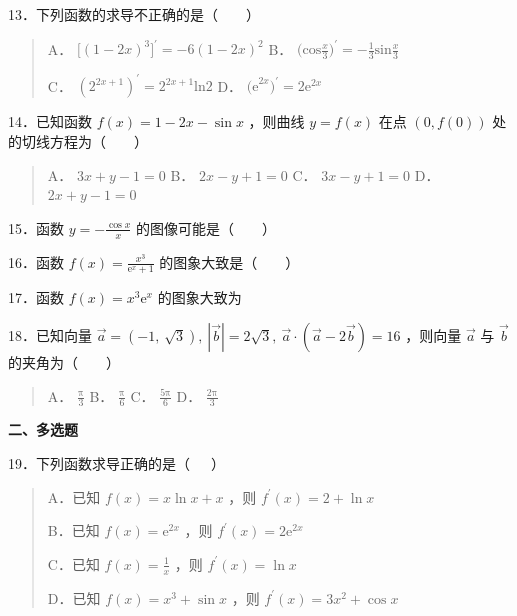 13．下列函数的求导不正确的是（~~~~）

\begin{quote}
    A． $\lbrack{(1 - 2x)}^{3}\rbrack^{\prime} = - 6{(1 - 2x)}^{2}$
    B． $\text{(cos}\frac{x}{3})^{\prime} = - \frac{1}{3}\text{sin}\frac{x}{3}$

    C． $(2^{2x + 1})^{\prime} = 2^{2x + 1}\text{ln}2$
    D． $\text{(e}^{2x})^{\prime} = 2\text{e}^{2x}$
\end{quote}

14．已知函数 $f(x) = 1 - 2x - \sin x$ ，则曲线 $y = f(x)$ 在点 $\left( 0,f(0) \right)$ 处的切线方程为（~~~~）

\begin{quote}
    A． $3x + y - 1 = 0$  B． $2x - y + 1 = 0$  C． $3x - y + 1 = 0$
    D． $2x + y - 1 = 0$
\end{quote}

15．函数 $y = - \frac{\cos x}{x}$ 的图像可能是（~~~~）

\begin{quote}
\end{quote}

16．函数 $f(x) = \frac{x^{3}}{\text{e}^{x} + 1}$ 的图象大致是（~~~~）

\begin{quote}
\end{quote}

17．函数 $f(x) = x^{3}\text{e}^{x}$ 的图象大致为

\begin{quote}
\end{quote}

18．已知向量 $\overrightarrow{a} = \left( - 1,\text{ }\sqrt{3} \right),\text{ }\left| \overrightarrow{b} \right| = 2\sqrt{3},\text{ }\overrightarrow{a} \cdot \left( \overrightarrow{a} - 2\overrightarrow{b} \right) = 16$ ，则向量 $\overrightarrow{a}$ 与 $\overrightarrow{b}$ 的夹角为（~~~~）

\begin{quote}
    A． $\frac{\text{π}}{3}$  B． $\frac{\text{π}}{6}$
    C． $\frac{5\text{π}}{6}$  D． $\frac{2\text{π}}{3}$
\end{quote}

\textbf{二、多选题}

19．下列函数求导正确的是（~~~）

\begin{quote}
    A．已知 $f(x) = x\ln x + x$ ，则 $f^{\prime}(x) = 2 + \ln x$

    B．已知 $f(x) = \text{e}^{2x}$ ，则 $f^{\prime}(x) = 2\text{e}^{2x}$

    C．已知 $f(x) = \frac{1}{x}$ ，则 $f^{\prime}(x) = \ln x$

    D．已知 $f(x) = x^{3} + \sin x$ ，则 $f^{\prime}(x) = 3x^{2} + \cos x$
\end{quote}

